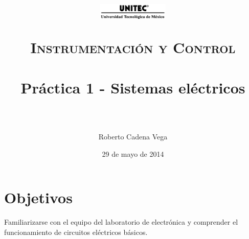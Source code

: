 



\title{
	\normalfont \normalsize
	\begin{figure}[h]
		\begin{center}
			\includegraphics[width=0.3\textwidth]{../images/UNITEC.png}
		\end{center}
	\end{figure}
	\textsc{Instrumentación y Control} \\ [25pt]
	\horrule{0.5pt} \\[0.4cm] %
	\huge Práctica 1 - Sistemas eléctricos \\ %
	\horrule{2pt} \\[0.5cm] %
}

\author{Roberto Cadena Vega} %

\date{\normalsize 29 de mayo de 2014} %




\maketitle %


\section{Objetivos}

	Familiarizarse con el equipo del laboratorio de electrónica y comprender el funcionamiento de circuitos eléctricos básicos.

